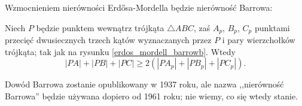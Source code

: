 
Wzmocnieniem nierówności Erdősa-Mordella będzie nierówność Barrowa:


\begin{theorem}
    Niech $P$ będzie punktem wewnątrz trójkąta $\triangle ABC$, zaś $A_p$, $B_p$, $C_p$ punktami przecięć dwusiecznych trzech kątów wyznaczanych przez $P$ i pary wierzchołków trójkąta; tak jak na rysunku \ref{erdos_mordell_barrowb}.
    Wtedy
    \begin{equation}
        |PA| + |PB| + |PC| \ge 2 (|PA_p| + |PB_p| + |PC_p|).
    \end{equation}
\end{theorem}

Dowód Barrowa zostanie opublikowany w 1937 roku, ale nazwa ,,nierówność Barrowa'' będzie używana dopiero od 1961 roku; nie wiemy, co się wtedy stanie.

%